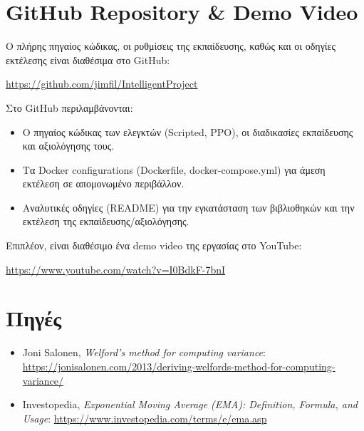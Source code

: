\documentclass[acmsmall,screen,nonacm]{acmart}
\begin{document}
	\section{GitHub Repository \& Demo Video}
	Ο πλήρης πηγαίος κώδικας, οι ρυθμίσεις της εκπαίδευσης, καθώς και οι οδηγίες εκτέλεσης είναι διαθέσιμα στο GitHub:
	\begin{center}
		\url{https://github.com/jimfil/IntelligentProject}
	\end{center}
	Στο GitHub περιλαμβάνονται:
	\begin{itemize}
		\item Ο πηγαίος κώδικας των ελεγκτών (Scripted, PPO), οι διαδικασίες εκπαίδευσης και αξιολόγησης τους.
		\item Τα Docker configurations (Dockerfile, docker-compose.yml) για άμεση εκτέλεση σε απομονωμένο περιβάλλον.
		\item Αναλυτικές οδηγίες (README) για την εγκατάσταση των βιβλιοθηκών και την εκτέλεση της εκπαίδευσης/αξιολόγησης.
	\end{itemize}
	Επιπλέον, είναι διαθέσιμο ένα demo video της εργασίας στο YouTube:
	\begin{center}
		\url{https://www.youtube.com/watch?v=I0BdkF-7bnI}
	\end{center}

	\section{Πηγές}
	\begin{itemize}
		\item Joni Salonen, \textit{Welford's method for computing variance}: \url{https://jonisalonen.com/2013/deriving-welfords-method-for-computing-variance/}
		\item Investopedia, \textit{Exponential Moving Average (EMA): Definition, Formula, and Usage}: \url{https://www.investopedia.com/terms/e/ema.asp}
	\end{itemize}
\end{document}
